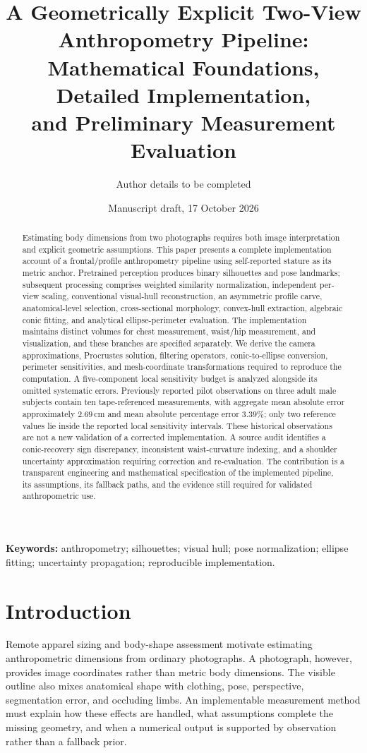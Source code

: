 \documentclass[11pt,a4paper]{article}
\title{A Geometrically Explicit Two-View Anthropometry Pipeline:\\
Mathematical Foundations, Detailed Implementation,\\
and Preliminary Measurement Evaluation}
\author{Author details to be completed}
\date{Manuscript draft, 17 October 2026}
\numberwithin{equation}{section}
\begin{document}
\maketitle

\begin{abstract}
Estimating body dimensions from two photographs requires both image interpretation and explicit geometric assumptions. This paper presents a complete implementation account of a frontal/profile anthropometry pipeline using self-reported stature as its metric anchor. Pretrained perception produces binary silhouettes and pose landmarks; subsequent processing comprises weighted similarity normalization, independent per-view scaling, conventional visual-hull reconstruction, an asymmetric profile carve, anatomical-level selection, cross-sectional morphology, convex-hull extraction, algebraic conic fitting, and analytical ellipse-perimeter evaluation. The implementation maintains distinct volumes for chest measurement, waist/hip measurement, and visualization, and these branches are specified separately. We derive the camera approximations, Procrustes solution, filtering operators, conic-to-ellipse conversion, perimeter sensitivities, and mesh-coordinate transformations required to reproduce the computation. A five-component local sensitivity budget is analyzed alongside its omitted systematic errors. Previously reported pilot observations on three adult male subjects contain ten tape-referenced measurements, with aggregate mean absolute error approximately $2.69$\,cm and mean absolute percentage error $3.39\%$; only two reference values lie inside the reported local sensitivity intervals. These historical observations are not a new validation of a corrected implementation. A source audit identifies a conic-recovery sign discrepancy, inconsistent waist-curvature indexing, and a shoulder uncertainty approximation requiring correction and re-evaluation. The contribution is a transparent engineering and mathematical specification of the implemented pipeline, its assumptions, its fallback paths, and the evidence still required for validated anthropometric use.
\end{abstract}

\noindent\textbf{Keywords:} anthropometry; silhouettes; visual hull; pose normalization; ellipse fitting; uncertainty propagation; reproducible implementation.

\section{Introduction}
Remote apparel sizing and body-shape assessment motivate estimating anthropometric dimensions from ordinary photographs. A photograph, however, provides image coordinates rather than metric body dimensions. The visible outline also mixes anatomical shape with clothing, pose, perspective, segmentation error, and occluding limbs. An implementable measurement method must explain how these effects are handled, what assumptions complete the missing geometry, and when a numerical output is supported by observation rather than a fallback prior.
\end{document}
